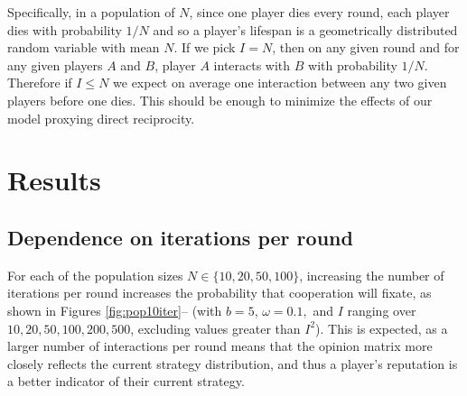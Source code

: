 \documentclass{amsart}
\newcommand{\om}{\omega}
\begin{document}
Specifically, in a population of $N$, since one player dies every
round, each player dies with probability $1/N$ and so a player's
lifespan is a geometrically distributed random variable with mean
$N$. If we pick $I=N$, then on any given round and for any given
players $A$ and $B$, player $A$ interacts with $B$ with probability
$1/N$. Therefore if $I\le N$ we expect on average one interaction
between any two given players before one dies. This should be enough
to minimize the effects of our model proxying direct reciprocity.

\section{Results}
\label{sec:results}

\subsection{Dependence on iterations per round}

For each of the population sizes $N \in \{10,20,50,100\}$, increasing
the number of iterations per round increases the probability that
cooperation will fixate, as shown in Figures
\ref{fig:pop10iter}-- (with $b=5$, $\om=0.1,$
and $I$ ranging over $10,20,50,100,200,500$, excluding values greater
than $I^2$). This is expected, as a larger number of interactions per
round means that the opinion matrix more closely reflects the current
strategy distribution, and thus a player's reputation is a better
indicator of their current strategy.
\end{document}
